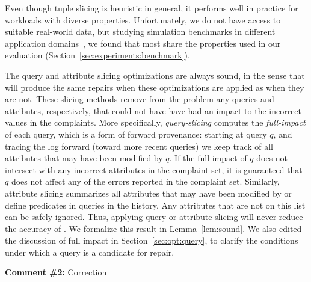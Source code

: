 Even though tuple slicing is heuristic in general, it performs well in
practice for workloads with diverse properties. Unfortunately, we do not have
access to suitable real-world data, but studying simulation benchmarks in
different application domains~\cite{oltpbench}, we found that most share the
properties used in our evaluation (Section~\ref{sec:experiments:benchmark}).



The query and attribute slicing optimizations are always sound, in the sense
that \sys will produce the same repairs when these optimizations are applied
as when they are not. These slicing methods remove from the problem any
queries and attributes, respectively, that could not have have had an impact
to the incorrect values in the complaints. More specifically,
\emph{query-slicing} computes the \emph{full-impact} of each query, which is a
form of forward provenance: starting at query $q$, and tracing the log forward
(toward more recent queries) we keep track of all attributes that may have
been modified by $q$. If the full-impact of $q$ does not intersect with any
incorrect attributes in the complaint set, it is guaranteed that $q$ does not
affect any of the errors reported in the complaint set. Similarly, attribute
slicing summarizes all attributes that may have been modified by or define
predicates in queries in the history. Any attributes that are not on this list
can be safely ignored. Thus, applying query or attribute slicing will never
reduce the accuracy of \sys. We formalize this result in
Lemma~\ref{lem:sound}. We also edited the discussion of full impact in
Section~\ref{sec:opt:query}, to clarify the conditions under which a query is
a candidate for repair.




\comskip

\noindent
\textbf{Comment \#2:} Correction
\begin{quote}
\end{quote}


